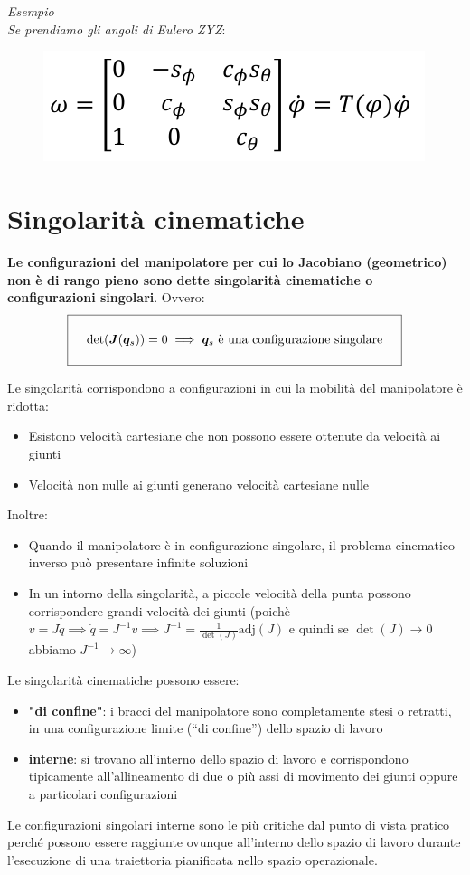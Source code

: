\vspace*{5pt}
\textit{Esempio \\ Se prendiamo gli angoli di Eulero ZYZ}:
\begin{figure}[H]
	\centering
	\includegraphics[width=0.4\linewidth]{images/diff_kine_6}
	\label{fig:diffkine6}
\end{figure}






\section{Singolarità cinematiche}
\textbf{Le configurazioni del manipolatore per cui lo Jacobiano (geometrico) non è di rango pieno sono dette singolarità cinematiche o configurazioni singolari}. Ovvero:
$$
\setlength{\fboxsep}{15pt}
\boxed{
\det(\bm{J}(\bm{q}_s)) = 0
\implies 
\bm{q}_s \text{ è una configurazione singolare}
}
$$

Le singolarità corrispondono a configurazioni in cui la mobilità del manipolatore è ridotta: 
\begin{itemize}
	\item Esistono velocità cartesiane che non possono essere ottenute da velocità ai giunti
	\item Velocità non nulle ai giunti generano velocità cartesiane nulle
\end{itemize}
Inoltre:
\begin{itemize}
	\item Quando il manipolatore è in configurazione singolare, il problema cinematico inverso può presentare infinite soluzioni
	\item In un intorno della singolarità, a piccole velocità della punta possono corrispondere grandi velocità dei giunti (poichè $v=J\dot{q} \implies \dot{q} = J^{-1}v \implies J^{-1} = \frac{1}{\det(J)} \text{adj}(J)$ e quindi se $\det(J) \to 0$ abbiamo $J^{-1} \to \infty$)
\end{itemize}

Le singolarità cinematiche possono essere:
\begin{itemize}
	\item \textbf{"di confine"}: i bracci del manipolatore sono completamente
	stesi o retratti, in una configurazione limite (“di confine”)
	dello spazio di lavoro
	\item \textbf{interne}: si trovano all’interno dello spazio di lavoro e
	corrispondono tipicamente all’allineamento di due o più assi
	di movimento dei giunti oppure a particolari configurazioni
\end{itemize}
Le configurazioni singolari interne sono le più critiche dal punto di vista pratico perché possono essere raggiunte ovunque all’interno dello spazio di lavoro durante l’esecuzione di una traiettoria pianificata nello spazio operazionale.


